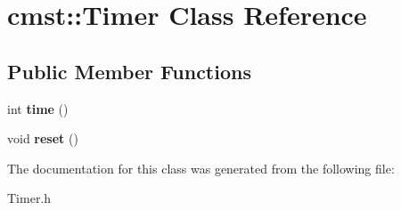 \hypertarget{classcmst_1_1_timer}{}\section{cmst\+:\+:Timer Class Reference}
\label{classcmst_1_1_timer}
\subsection*{Public Member Functions}
\begin{DoxyCompactItemize}
\item 
int {\bfseries time} ()\hypertarget{classcmst_1_1_timer_af0145067ee61560f2363dc4a1cb552b9}{}\label{classcmst_1_1_timer_af0145067ee61560f2363dc4a1cb552b9}

\item 
void {\bfseries reset} ()\hypertarget{classcmst_1_1_timer_a8c7011cc646563211b681249df6dd4cf}{}\label{classcmst_1_1_timer_a8c7011cc646563211b681249df6dd4cf}

\end{DoxyCompactItemize}


The documentation for this class was generated from the following file\+:\begin{DoxyCompactItemize}
\item 
Timer.\+h\end{DoxyCompactItemize}
